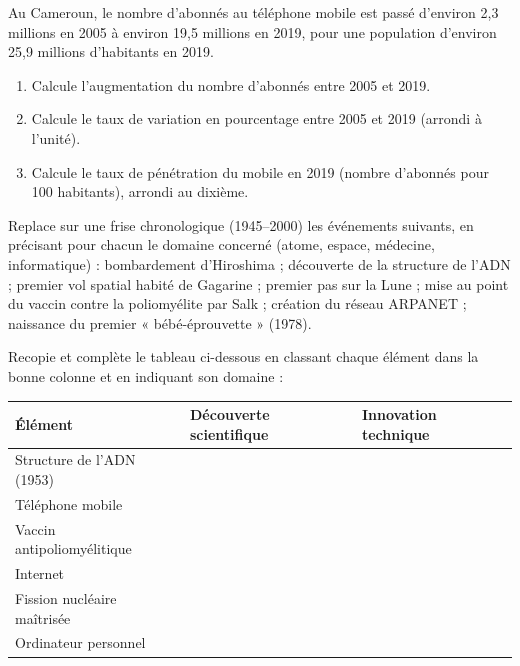 \documentclass[11pt]{article}
\newcounter{popsec}
\newcounter{popsub}
\newcommand{\courssub}[1]{%
  \stepcounter{popsub}%
  \par\vspace{9pt}\noindent{\popxbold\fontsize{11.5}{13}\selectfont\color{popink}{\color{poporange}\thepopsec.\thepopsub}\hspace{6pt}#1}\par\nopagebreak\vspace{4pt}
}
\begin{document}
\begin{exercice}
Au Cameroun, le nombre d'abonnés au téléphone mobile est passé d'environ 2,3 millions en 2005 à environ 19,5 millions en 2019, pour une population d'environ 25,9 millions d'habitants en 2019.
\begin{enumerate}
\item Calcule l'augmentation du nombre d'abonnés entre 2005 et 2019.
\item Calcule le taux de variation en pourcentage entre 2005 et 2019 (arrondi à l'unité).
\item Calcule le taux de pénétration du mobile en 2019 (nombre d'abonnés pour 100 habitants), arrondi au dixième.
\end{enumerate}
\end{exercice}

\courssub{Je m'entraîne}

\begin{exercice}
Replace sur une frise chronologique (1945--2000) les événements suivants, en précisant pour chacun le domaine concerné (atome, espace, médecine, informatique) : bombardement d'Hiroshima ; découverte de la structure de l'ADN ; premier vol spatial habité de Gagarine ; premier pas sur la Lune ; mise au point du vaccin contre la poliomyélite par Salk ; création du réseau ARPANET ; naissance du premier « bébé-éprouvette » (1978).
\end{exercice}

\begin{exercice}
Recopie et complète le tableau ci-dessous en classant chaque élément dans la bonne colonne et en indiquant son domaine :
\begin{center}
\begin{tabularx}{\linewidth}{|l|X|X|}
\hline
\rowcolor{popblueL} \textbf{Élément} & \textbf{Découverte scientifique} & \textbf{Innovation technique} \\
\hline
Structure de l'ADN (1953) & & \\
\hline
Téléphone mobile & & \\
\hline
Vaccin antipoliomyélitique & & \\
\hline
Internet & & \\
\hline
Fission nucléaire maîtrisée & & \\
\hline
Ordinateur personnel & & \\
\hline
\end{tabularx}
\end{center}
\end{exercice}
\end{document}
